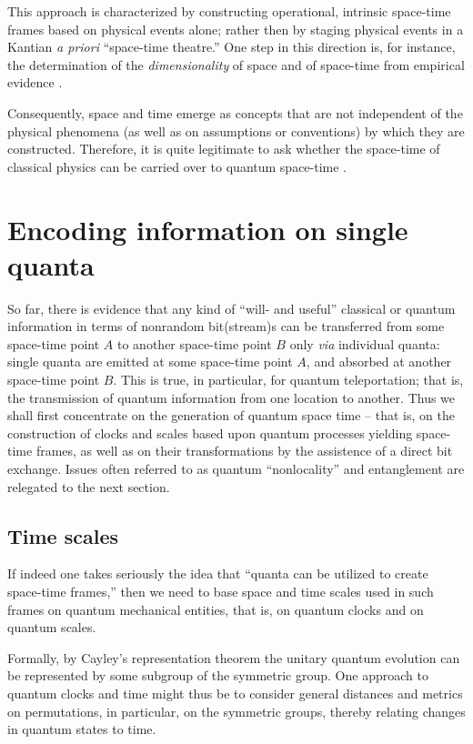 \documentclass[%
  preprint,
 showpacs,
 showkeys,
 preprintnumbers,
 amsmath,amssymb,
 aps,
  pra,
  longbibliography,
 ]{revtex4-1}
\begin{document}
This approach is characterized by constructing operational, intrinsic space-time frames based on physical events alone;
rather then by staging physical events in a Kantian {\it a priori} ``space-time theatre.''
One step in this direction is, for instance, the determination of the {\em dimensionality} of space and of space-time from
empirical evidence \cite{sv2}.

Consequently, space and time emerge as concepts that are not independent of the physical phenomena
(as well as on assumptions or conventions) by which they are constructed.
Therefore, it is quite legitimate to ask whether the space-time of classical physics can be
carried over to quantum space-time \cite{Kreinovich-94,Myrvold2002435}.



\section{Encoding information on single quanta}


So far, there is evidence that any kind of ``will- and useful'' classical or quantum
information in terms of nonrandom bit(stream)s  can be transferred from some space-time point $A$
to another space-time point $B$ only {\em via} individual quanta:
single quanta are emitted at some space-time point   $A$, and absorbed at another space-time point $B$.
This is true, in particular, for quantum teleportation; that is, the transmission of quantum information from one location to another.
Thus we shall first concentrate on the generation of quantum space time
-- that is, on the construction of clocks and scales based upon quantum processes
yielding space-time frames, as well as on their transformations by the assistence of a direct bit exchange.
Issues often referred to as quantum ``nonlocality'' and entanglement are relegated to the next section.



\subsection{Time scales}

If indeed one takes seriously the idea that ``quanta can be utilized to create space-time frames,''
then we need to base space and time scales used in such frames on quantum mechanical entities,
that is, on quantum clocks and on quantum scales.

Formally, by Cayley's representation theorem the unitary quantum evolution can be represented by some subgroup of the symmetric group.
One approach to quantum clocks and time might thus be to consider general distances and metrics on permutations, in particular,
on the symmetric groups, thereby relating changes in quantum states to time.
\end{document}
